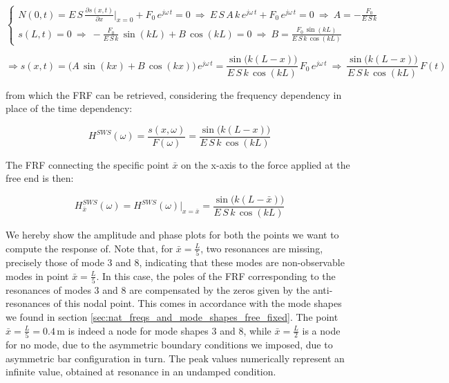 \documentclass[a4paper,12pt,oneside]{article}
\begin{document}
\[ \begin{cases}
	N(0,t) = E \, S \, \frac{\partial s(x,t)}{\partial x}\Big|_{x=0} +
		F_0 \, e^{j \omega \, t} = 0
		~ \Rightarrow ~ E \, S \, A \, k \, e^{j \omega \, t} +
		F_0 \, e^{j \omega \, t} = 0
		~ \Rightarrow ~ A = -\frac{F_0}{E \, S \, k} \\
	s(L,t) = 0 ~ \Rightarrow ~ -\frac{F_0}{E \, S \, k} \, \sin(kL) + B \, \cos(kL) = 0
		~ \Rightarrow ~ B = \frac{F_0 \, \sin(kL)}{E \, S \, k \, \cos(kL)}
\end{cases} \]

\[
	\Rightarrow s(x,t) = \bigl(A \, \sin(kx) + B \, \cos(kx)\bigl) \, e^{j \omega \, t} =
		\frac{\sin\bigl(k(L - x)\bigr)}{E \, S \, k \, \cos(kL)} \,
		F_0 \, e^{j \omega \, t}
		~ \Rightarrow ~ \frac{\sin\bigl(k(L - x)\bigr)}{E \, S \, k \, \cos(kL)} \, F(t)
\]

from which the FRF can be retrieved, considering the frequency dependency in place of the time dependency:

\[
	H^{SWS}(\omega) = \frac{s(x, \omega)}{F(\omega)} =
		\frac{\sin\bigl(k(L - x)\bigr)}{E \, S \, k \, \cos(kL)}
\]

\vspace{20pt}

The FRF connecting the specific point $ \bar{x} $ on the x-axis to the force applied at the free end is then:

\begin{equation}
\label{eqn:frf_sws}
	H^{SWS}_{\bar{x}}(\omega) = H^{SWS}(\omega)\big|_{x = \bar{x}} =
		\frac{\sin\bigl(k(L - \bar{x})\bigr)}{E \, S \, k \, \cos(kL)}
\end{equation}

\vspace{20pt}

We hereby show the amplitude and phase plots for both the points we want to compute the response of. Note that, for $ \bar{x} = \frac{L}{5} $, two resonances are missing, precisely those of mode 3 and 8, indicating that these modes are non-observable modes in point $ \bar{x} = \frac{L}{5} $. In this case, the poles of the FRF corresponding to the resonances of modes 3 and 8 are compensated by the zeros given by the anti-resonances of this nodal point. This comes in accordance with the mode shapes we found in section \ref{sec:nat_freqs_and_mode_shapes_free_fixed}. The point $ \bar{x} = \frac{L}{5} = 0.4 \, \text{m} $ is indeed a node for mode shapes 3 and 8, while $ \bar{x} = \frac{L}{2} $ is a node for no mode, due to the asymmetric boundary conditions we imposed, due to asymmetric bar configuration in turn. The peak values numerically represent an infinite value, obtained at resonance in an undamped condition.
\end{document}

